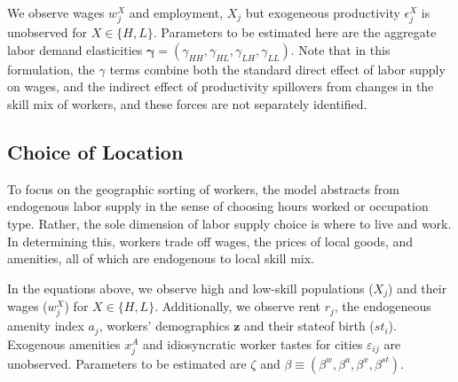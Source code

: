 \documentclass{article}
\begin{document}
We observe wages $w_{j}^X$ and employment, $X_{j}$ but exogeneous productivity $\epsilon_{j}^X$ is unobserved for $X \in \{H, L\}$. Parameters to be estimated here are the aggregate labor demand elasticities $\bm{\gamma} = (\gamma_{HH}, \gamma_{HL}, \gamma_{LH}, \gamma_{LL})$. Note that in this formulation,  the $\gamma$ terms combine both the standard direct effect of labor supply on wages, and the indirect effect of productivity spillovers from changes in the skill mix of workers, and these forces are not separately identified. 

\subsection{Choice of Location}


To focus on the geographic sorting of workers, the model abstracts from endogenous labor supply in the sense of choosing hours worked or occupation type. Rather, the sole dimension of labor supply choice is where to live and work. In determining this, workers trade off wages, the prices of local goods, and amenities, all of which are endogenous to local skill mix. 

In the equations above, we observe high and low-skill populations ($X_{j}$) and their wages ($w_{j}^X$) for $X \in \{H, L\}$. Additionally, we observe rent $r_{j}$, the endogeneous amenity index $a_{j}$, workers' demographics $\bm{z}$ and their stateof birth ($st_i$). Exogenous amenities $x_{j}^A$ and idiosyncratic worker tastes for cities $\varepsilon_{ij}$ are unobserved. Parameters to be estimated are $\zeta$ and $\beta \equiv (\beta^w, \beta^a, \beta^x, \beta^{st})$.
\end{document}
